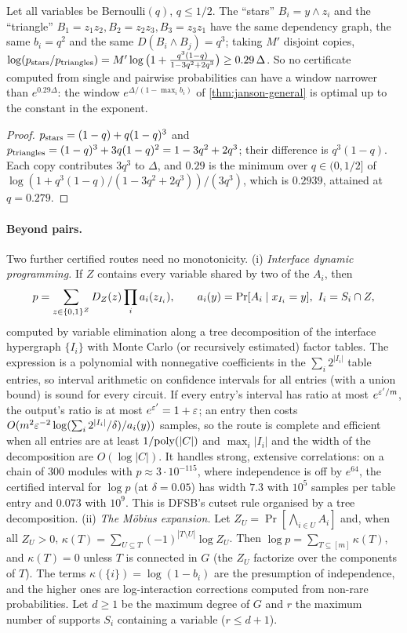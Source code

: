 \begin{proposition}\label{prop:pairwise-barrier}
Let all variables be Bernoulli$(q)$, $q\le1/2$. The ``stars'' $B_i=y\wedge z_i$
and the ``triangle'' $B_1=z_1z_2,B_2=z_2z_3,B_3=z_3z_1$ have the same dependency
graph, the same $b_i=q^2$ and the same $D(B_i\wedge B_j)=q^3$; taking $M'$ disjoint
copies, $\log(p_{\rm stars}/p_{\rm triangles})=M'\log\big(1+\frac{q^3(1-q)}{1-3q^2+2q^3}\big)\ge0.29\,\Delta$.
So no certificate computed from single and pairwise probabilities can have a
window narrower than $e^{0.29\Delta}$: the window $e^{\Delta/(1-\max_ib_i)}$ of
\cref{thm:janson-general} is optimal up to the constant in the exponent.
\end{proposition}

\begin{proof}
$p_{\rm stars}=(1-q)+q(1-q)^3$ and $p_{\rm triangles}=(1-q)^3+3q(1-q)^2=1-3q^2+2q^3$;
their difference is $q^3(1-q)$. Each copy contributes $3q^3$ to $\Delta$, and $0.29$ is
the minimum over $q\in(0,1/2]$ of $\log(1+q^3(1-q)/(1-3q^2+2q^3))/(3q^3)$, which is
$0.2939$, attained at $q=0.279$.
\end{proof}

\paragraph{Beyond pairs.} Two further certified routes need no monotonicity.
(i) \emph{Interface dynamic programming.} If $Z$ contains every variable shared by
two of the $A_i$, then
\[
p=\sum_{z\in\{0,1\}^Z}D_Z(z)\prod_ia_i(z_{I_i}),\qquad a_i(y)=\Pr[A_i\mid x_{I_i}=y],\ I_i=S_i\cap Z,
\]
computed by variable elimination along a tree decomposition of
the interface hypergraph $\{I_i\}$ with Monte Carlo (or recursively estimated) factor
tables. The expression is a polynomial with nonnegative coefficients in the
$\sum_i2^{|I_i|}$ table entries, so interval arithmetic on confidence intervals for
all entries (with a union bound) is sound for every circuit. If every entry's
interval has ratio at most $e^{\varepsilon'/m}$, the output's ratio is at most $e^{\varepsilon'}=1+\varepsilon$;
an entry then costs $O(m^2\varepsilon^{-2}\log(\sum_i2^{|I_i|}/\delta)/a_i(y))$ samples, so the
route is complete and efficient when all entries are at least $1/\mathrm{poly}(|C|)$ and
$\max_i|I_i|$ and the width of the decomposition are $O(\log|C|)$. It handles strong,
extensive correlations: on a chain of $300$ modules with $p\approx3\cdot10^{-115}$,
where independence is off by $e^{64}$, the certified interval for $\log p$ (at
$\delta=0.05$) has width $7.3$ with $10^5$ samples per table entry and $0.073$ with $10^9$. This is DFSB's cutset
rule organised by a tree decomposition.
(ii) \emph{The Möbius expansion.} Let $Z_U=\Pr[\bigwedge_{i\in U}A_i]$ and, when all
$Z_U>0$, $\kappa(T)=\sum_{U\subseteq T}(-1)^{|T\setminus U|}\log Z_U$. Then
$\log p=\sum_{T\subseteq[m]}\kappa(T)$, and $\kappa(T)=0$ unless $T$ is connected in $G$
(the $Z_U$ factorize over the components of $T$). The terms $\kappa(\{i\})=\log(1-b_i)$
are the presumption of independence, and the higher ones are log-interaction
corrections computed from non-rare probabilities. Let $d\ge1$ be the maximum degree
of $G$ and $r$ the maximum number of supports $S_i$ containing a variable ($r\le d+1$).

